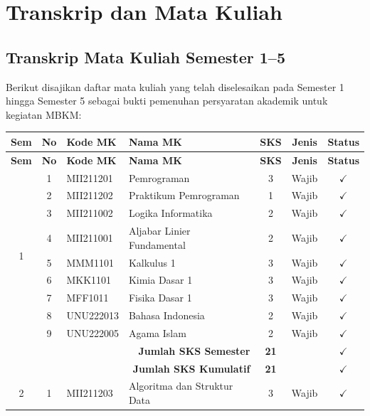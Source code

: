 \section{Transkrip dan Mata Kuliah}

\subsection{Transkrip Mata Kuliah Semester 1--5}

Berikut disajikan daftar mata kuliah yang telah diselesaikan pada Semester 1 hingga Semester 5 sebagai bukti pemenuhan persyaratan akademik untuk kegiatan MBKM:

\begin{longtable}{|c|c|l|p{5.5cm}|c|c|c|}
    \hline
    \textbf{Sem} & \textbf{No} & \textbf{Kode MK} & \textbf{Nama MK} & \textbf{SKS} & \textbf{Jenis} & \textbf{Status} \\
    \hline
    \endfirsthead
    \hline
    \textbf{Sem} & \textbf{No} & \textbf{Kode MK} & \textbf{Nama MK} & \textbf{SKS} & \textbf{Jenis} & \textbf{Status} \\
    \hline
    \endhead
    \multirow{9}{*}{1}
    & 1 & MII211201 & Pemrograman & 3 & Wajib & $\checkmark$ \\
    & 2 & MII211202 & Praktikum Pemrograman & 1 & Wajib & $\checkmark$ \\
    & 3 & MII211002 & Logika Informatika & 2 & Wajib & $\checkmark$ \\
    & 4 & MII211001 & Aljabar Linier Fundamental & 2 & Wajib & $\checkmark$ \\
    & 5 & MMM1101 & Kalkulus 1 & 3 & Wajib & $\checkmark$ \\
    & 6 & MKK1101 & Kimia Dasar 1 & 3 & Wajib & $\checkmark$ \\
    & 7 & MFF1011 & Fisika Dasar 1 & 3 & Wajib & $\checkmark$ \\
    & 8 & UNU222013 & Bahasa Indonesia & 2 & Wajib & $\checkmark$ \\
    & 9 & UNU222005 & Agama Islam & 2 & Wajib & $\checkmark$ \\
    \hline
    \multicolumn{4}{|r|}{\textbf{Jumlah SKS Semester}} & \textbf{21} & & $\checkmark$ \\
    \multicolumn{4}{|r|}{\textbf{Jumlah SKS Kumulatif}} & \textbf{21} & & $\checkmark$ \\
    \hline
    \multirow{10}{*}{2}
    & 1 & MII211203 & Algoritma dan Struktur Data & 3 & Wajib & $\checkmark$ \\

\end{longtable}
